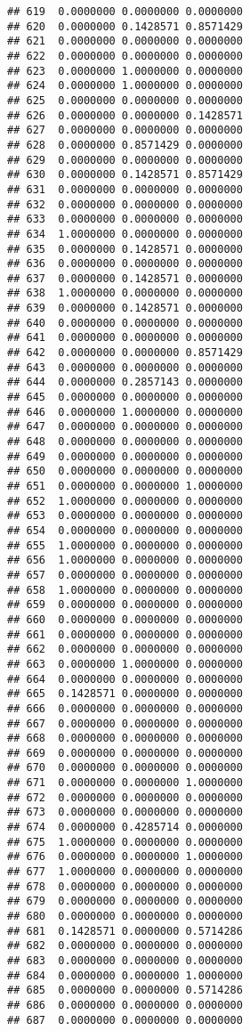 \documentclass[
]{article}
\begin{document}
\begin{verbatim}
## 619  0.0000000 0.0000000 0.0000000
## 620  0.0000000 0.1428571 0.8571429
## 621  0.0000000 0.0000000 0.0000000
## 622  0.0000000 0.0000000 0.0000000
## 623  0.0000000 1.0000000 0.0000000
## 624  0.0000000 1.0000000 0.0000000
## 625  0.0000000 0.0000000 0.0000000
## 626  0.0000000 0.0000000 0.1428571
## 627  0.0000000 0.0000000 0.0000000
## 628  0.0000000 0.8571429 0.0000000
## 629  0.0000000 0.0000000 0.0000000
## 630  0.0000000 0.1428571 0.8571429
## 631  0.0000000 0.0000000 0.0000000
## 632  0.0000000 0.0000000 0.0000000
## 633  0.0000000 0.0000000 0.0000000
## 634  1.0000000 0.0000000 0.0000000
## 635  0.0000000 0.1428571 0.0000000
## 636  0.0000000 0.0000000 0.0000000
## 637  0.0000000 0.1428571 0.0000000
## 638  1.0000000 0.0000000 0.0000000
## 639  0.0000000 0.1428571 0.0000000
## 640  0.0000000 0.0000000 0.0000000
## 641  0.0000000 0.0000000 0.0000000
## 642  0.0000000 0.0000000 0.8571429
## 643  0.0000000 0.0000000 0.0000000
## 644  0.0000000 0.2857143 0.0000000
## 645  0.0000000 0.0000000 0.0000000
## 646  0.0000000 1.0000000 0.0000000
## 647  0.0000000 0.0000000 0.0000000
## 648  0.0000000 0.0000000 0.0000000
## 649  0.0000000 0.0000000 0.0000000
## 650  0.0000000 0.0000000 0.0000000
## 651  0.0000000 0.0000000 1.0000000
## 652  1.0000000 0.0000000 0.0000000
## 653  0.0000000 0.0000000 0.0000000
## 654  0.0000000 0.0000000 0.0000000
## 655  1.0000000 0.0000000 0.0000000
## 656  1.0000000 0.0000000 0.0000000
## 657  0.0000000 0.0000000 0.0000000
## 658  1.0000000 0.0000000 0.0000000
## 659  0.0000000 0.0000000 0.0000000
## 660  0.0000000 0.0000000 0.0000000
## 661  0.0000000 0.0000000 0.0000000
## 662  0.0000000 0.0000000 0.0000000
## 663  0.0000000 1.0000000 0.0000000
## 664  0.0000000 0.0000000 0.0000000
## 665  0.1428571 0.0000000 0.0000000
## 666  0.0000000 0.0000000 0.0000000
## 667  0.0000000 0.0000000 0.0000000
## 668  0.0000000 0.0000000 0.0000000
## 669  0.0000000 0.0000000 0.0000000
## 670  0.0000000 0.0000000 0.0000000
## 671  0.0000000 0.0000000 1.0000000
## 672  0.0000000 0.0000000 0.0000000
## 673  0.0000000 0.0000000 0.0000000
## 674  0.0000000 0.4285714 0.0000000
## 675  1.0000000 0.0000000 0.0000000
## 676  0.0000000 0.0000000 1.0000000
## 677  1.0000000 0.0000000 0.0000000
## 678  0.0000000 0.0000000 0.0000000
## 679  0.0000000 0.0000000 0.0000000
## 680  0.0000000 0.0000000 0.0000000
## 681  0.1428571 0.0000000 0.5714286
## 682  0.0000000 0.0000000 0.0000000
## 683  0.0000000 0.0000000 0.0000000
## 684  0.0000000 0.0000000 1.0000000
## 685  0.0000000 0.0000000 0.5714286
## 686  0.0000000 0.0000000 0.0000000
## 687  0.0000000 0.0000000 0.0000000

\end{verbatim}
\end{document}
